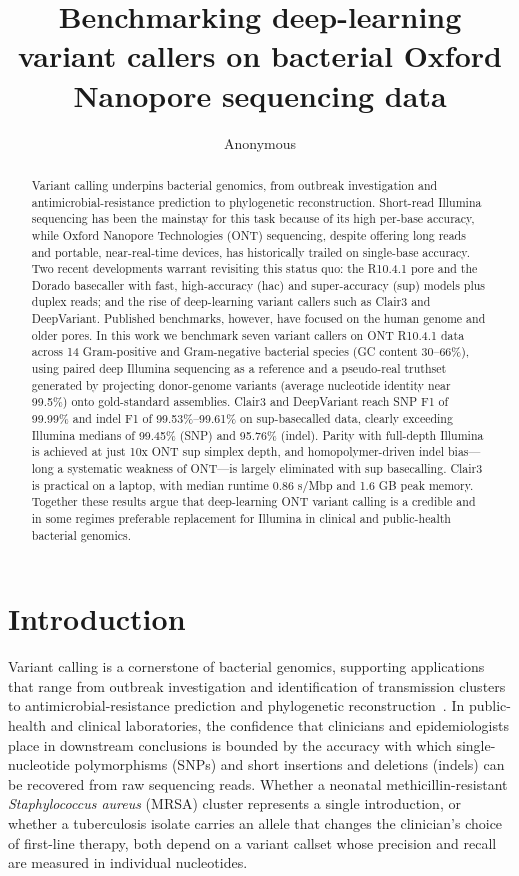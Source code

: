 \documentclass[11pt]{article}
\title{Benchmarking deep-learning variant callers on bacterial Oxford Nanopore sequencing data}
\author{Anonymous}
\date{}
\begin{document}
\maketitle

\begin{abstract}
Variant calling underpins bacterial genomics, from outbreak investigation and antimicrobial-resistance prediction to phylogenetic reconstruction. Short-read Illumina sequencing has been the mainstay for this task because of its high per-base accuracy, while Oxford Nanopore Technologies (ONT) sequencing, despite offering long reads and portable, near-real-time devices, has historically trailed on single-base accuracy. Two recent developments warrant revisiting this status quo: the R10.4.1 pore and the Dorado basecaller with fast, high-accuracy (hac) and super-accuracy (sup) models plus duplex reads; and the rise of deep-learning variant callers such as Clair3 and DeepVariant. Published benchmarks, however, have focused on the human genome and older pores. In this work we benchmark seven variant callers on ONT R10.4.1 data across 14 Gram-positive and Gram-negative bacterial species (GC content 30--66\%), using paired deep Illumina sequencing as a reference and a pseudo-real truthset generated by projecting donor-genome variants (average nucleotide identity near 99.5\%) onto gold-standard assemblies. Clair3 and DeepVariant reach SNP F1 of 99.99\% and indel F1 of 99.53\%--99.61\% on sup-basecalled data, clearly exceeding Illumina medians of 99.45\% (SNP) and 95.76\% (indel). Parity with full-depth Illumina is achieved at just 10x ONT sup simplex depth, and homopolymer-driven indel bias---long a systematic weakness of ONT---is largely eliminated with sup basecalling. Clair3 is practical on a laptop, with median runtime 0.86 s/Mbp and 1.6 GB peak memory. Together these results argue that deep-learning ONT variant calling is a credible and in some regimes preferable replacement for Illumina in clinical and public-health bacterial genomics.
\end{abstract}

\section{Introduction}

Variant calling is a cornerstone of bacterial genomics, supporting applications that range from outbreak investigation and identification of transmission clusters to antimicrobial-resistance prediction and phylogenetic reconstruction~\citep{didelot2012transforming,koser2012rapid,bush2020genomic}. In public-health and clinical laboratories, the confidence that clinicians and epidemiologists place in downstream conclusions is bounded by the accuracy with which single-nucleotide polymorphisms (SNPs) and short insertions and deletions (indels) can be recovered from raw sequencing reads. Whether a neonatal methicillin-resistant \emph{Staphylococcus aureus} (MRSA) cluster represents a single introduction, or whether a tuberculosis isolate carries an allele that changes the clinician's choice of first-line therapy, both depend on a variant callset whose precision and recall are measured in individual nucleotides.
\end{document}

